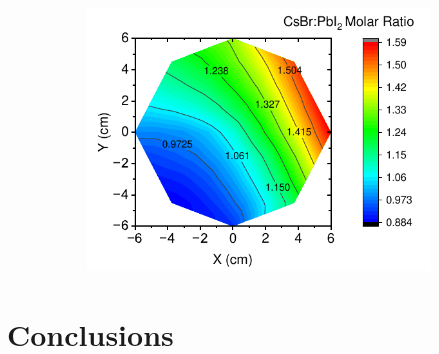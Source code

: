 \begin{figure}[htbp]
    \centering
    \begin{subfigure}[t]{0.7\textwidth}
        \centering
        \includegraphics[width=\textwidth]{chapters/stability/imeges/Molar_Ratio.pdf} %
    \end{subfigure}

    \caption{}
    \label{}
\end{figure}


\section{Conclusions}

\cleardoublepage

